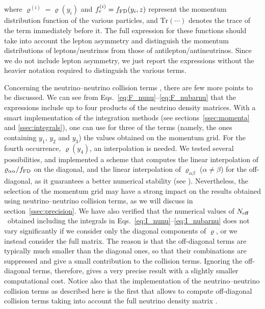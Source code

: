\documentclass[notitlepage,showpacs,preprintnumbers,amsmath,amssymb,superscriptaddress,prd,onecolumn]{revtex4-1}
\newcommand{\Neff}{\ensuremath{N_{\rm eff}}}
\begin{document}
where $\varrho^{(i)}=\varrho(y_i)$ and $f_e^{(i)}=f_{\rm FD}(y_i, z)$ represent the momentum distribution function
of the various particles,
and $\mathrm{Tr}(\cdots)$ denotes the trace of the term immediately before it.
The full expression for these functions should take into account the lepton asymmetry and distinguish
the momentum distributions of leptons/neutrinos from those of antilepton/antineutrinos.
Since we do not include lepton asymmetry, we just report the expressions without the heavier notation
required to distinguish the various terms.

Concerning the neutrino--neutrino collision terms \cite{Bennett:inprep},
there are few more points to be discussed.
We can see from Eqs.~\eqref{eq:F_nunu}--\eqref{eq:F_nubarnu} that the expressions include
up to four products of the neutrino density matrices.
With a smart implementation of the integration methods
(see sections~\ref{ssec:momenta} and \ref{ssec:integrals}),
one can use for three of the terms (namely, the ones containing $y_1$, $y_2$ and $y_3$)
the values obtained on the momentum grid.
For the fourth occurrence, $\varrho(y_4)$, an interpolation is needed.
We tested several possibilities, and implemented a scheme that computes
the linear interpolation of $\varrho_{\alpha\alpha}/f_{\rm FD}$ on the diagonal,
and the linear interpolation of $\varrho_{\alpha\beta}$ ($\alpha\neq\beta$) for the off-diagonal,
as it guarantees a better numerical stability (see \cite{Bennett:inprep}).
Nevertheless, the selection of the momentum grid may have a strong impact on the results obtained using
neutrino--neutrino collision terms, as we will discuss in section~\ref{ssec:precision}.
We have also verified that the numerical values of \Neff\ obtained including the integrals in
Eqs.~\eqref{eq:I_nunu}--\eqref{eq:I_nubarnu}
does not vary significantly if we consider only the diagonal components of $\varrho$,
or we instead consider the full matrix.
The reason is that the off-diagonal terms are typically much smaller than the diagonal ones,
so that their combinations are suppressed and give a small contribution to the collision terms.
Ignoring the off-diagonal terms, therefore, gives a very precise result with a slightly smaller computational cost.
Notice also that the implementation of the neutrino--neutrino collision terms as described here
is the first that allows to compute off-diagonal collision terms
taking into account the full neutrino density matrix \cite{Bennett:inprep}.
\end{document}
